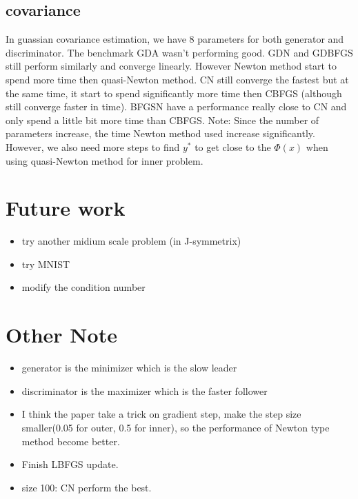 \documentclass{article}
\begin{document}
\subsection{covariance}
In guassian covariance estimation, we have 8 parameters for both generator and discriminator.
The benchmark GDA wasn't performing good.
GDN and GDBFGS still perform similarly and converge linearly. However Newton method start to spend more time then quasi-Newton method.
CN still converge the fastest but at the same time, it start to spend significantly more time then CBFGS (although still converge faster in time).
BFGSN have a performance really close to CN and only spend a little bit more time than CBFGS.
Note: Since the number of parameters increase, the time Newton method used increase significantly. However, we also need more steps to find $y^*$ to get close to the $\Phi(x)$ when using quasi-Newton method for inner problem.

\section{Future work}
\begin{itemize}
    \item try another midium scale problem (in J-symmetrix)
    \item try MNIST
    \item modify the condition number
\end{itemize}

\section{Other Note}
\begin{itemize}
    \item generator is the minimizer which is the slow leader
    \item discriminator is the maximizer which is the faster follower
    \item I think the paper take a trick on gradient step, make the step size smaller(0.05 for outer, 0.5 for inner), so the performance of Newton type method become better.
    \item Finish LBFGS update.
    \item size 100: CN perform the best.
\end{itemize}
\end{document}
